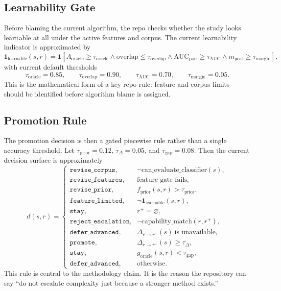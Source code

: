 \documentclass[11pt]{article}
\begin{document}
\subsection{Learnability Gate}
Before blaming the current algorithm, the repo checks whether the study looks
learnable at all under the active features and corpus. The current learnability
indicator is approximated by
\begin{equation}
\mathbf{1}_{\text{learnable}}(s,r)
=
\mathbf{1}\!\left[
    A_{\text{oracle}} \ge \tau_{\text{oracle}}
    \land
    \mathrm{overlap} \le \tau_{\text{overlap}}
    \land
    \mathrm{AUC}_{\text{pair}} \ge \tau_{\text{AUC}}
    \land
    m_{\text{post}} \ge \tau_{\text{margin}}
\right],
\end{equation}
with current default thresholds
\begin{equation}
\tau_{\text{oracle}} = 0.85,\qquad
\tau_{\text{overlap}} = 0.90,\qquad
\tau_{\text{AUC}} = 0.70,\qquad
\tau_{\text{margin}} = 0.05.
\end{equation}
This is the mathematical form of a key repo rule: feature and corpus limits
should be identified before algorithm blame is assigned.

\subsection{Promotion Rule}
The promotion decision is then a gated piecewise rule rather than a single
accuracy threshold. Let \(\tau_{\text{prior}} = 0.12\),
\(\tau_{\Delta} = 0.05\), and \(\tau_{\text{gap}} = 0.08\). Then the current
decision surface is approximately
\begin{equation}
d(s,r)
=
\begin{cases}
    \texttt{revise\_corpus}, & \neg \text{can\_evaluate\_classifier}(s), \\
    \texttt{revise\_features}, & \text{feature gate fails}, \\
    \texttt{revise\_prior}, & f_{\text{prior}}(s,r) > \tau_{\text{prior}}, \\
    \texttt{feature\_limited}, & \neg \mathbf{1}_{\text{learnable}}(s,r), \\
    \texttt{stay}, & r^+ = \varnothing, \\
    \texttt{reject\_escalation}, & \neg \text{capability\_match}(r,r^+), \\
    \texttt{defer\_advanced}, & \Delta_{r \rightarrow r^+}(s)\ \text{is unavailable}, \\
    \texttt{promote}, & \Delta_{r \rightarrow r^+}(s) \ge \tau_{\Delta}, \\
    \texttt{stay}, & g_{\text{oracle}}(s,r) < \tau_{\text{gap}}, \\
    \texttt{defer\_advanced}, & \text{otherwise}.
\end{cases}
\end{equation}
This rule is central to the methodology claim. It is the reason the repository
can say “do not escalate complexity just because a stronger method exists.”
\end{document}
